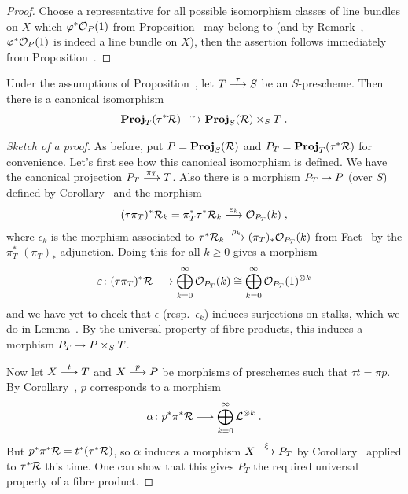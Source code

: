 \documentclass[a4paper,parskip=half,numbers=enddot, DIV=12]{scrreprt}
\renewcommand{\geq}{\geqslant}
\begin{document}
\begin{proof}
	Choose a representative for all possible isomorphism classes of line bundles on $X$ which $\varphi^*\mathcal{O}_P(1)$ from Proposition~ may belong to (and by Remark~, $\varphi^*\mathcal{O}_P(1)$ is indeed a line bundle on $X$), then the assertion follows immediately from Proposition~.
\end{proof}
\begin{cor}
	Under the assumptions of Proposition~, let $T\morphism[\tau]S$ be an $S$-prescheme. Then there is a canonical isomorphism 
	\begin{align*}
		\PROJ_T(\tau^*\Rr)\isomorphism \PROJ_S(\Rr)\times_ST\;.
	\end{align*} 
\end{cor}
\begin{proof}[Sketch of a proof]
	As before, put $P=\operatorname{\mathbf{Proj}}_S(\mathcal{R})$ and $P_T=\operatorname{\mathbf{Proj}}_T(\tau^*\mathcal{R})$ for convenience. Let's first see how this canonical isomorphism is defined. We have the canonical projection $P_T\morphism[\pi_T]T$. Also there is a morphism $P_T\morphism P$ (over $S$) defined by Corollary~ and the morphism
	\begin{align*}
		(\tau\pi_T)^*\Rr_k= \pi_T^*\tau^*\Rr_k\morphism[\epsilon_k]\Oo_{P_T}(k)\;,
	\end{align*}
	where $\epsilon_k$ is the morphism associated to $\tau^*\Rr_k\morphism[\rho_k](\pi_T)_*\Oo_{P_T}(k)$ from Fact~ by the $\pi_T^*$-$(\pi_T)_*$ adjunction. Doing this for all $k\geq 0$ gives a morphism
	\begin{align*}
		\epsilon\colon (\tau\pi_T)^*\Rr\morphism\bigoplus_{k=0}^\infty\Oo_{P_T}(k)\cong\bigoplus_{k=0}^\infty\Oo_{P_T}(1)^{\otimes k}
	\end{align*}
	and we have yet to check that $\epsilon$ (resp.\ $\epsilon_k$) induces surjections on stalks, which we do in Lemma~. By the universal property of fibre products, this induces a morphism $P_T\morphism P\times_ST$.
	
	Now let $X\morphism[t]T$ and $X\morphism[p]P$ be morphisms of preschemes such that $\tau t=\pi p$. By Corollary~, $p$ corresponds to a morphism
	\begin{align*}
		\alpha\colon p^*\pi^*\Rr\morphism\bigoplus_{k=0}^\infty\Ll^{\otimes k}\;.
	\end{align*}
	But $p^*\pi^*\mathcal{R}=t^*(\tau^*\mathcal{R})$, so $\alpha$ induces a morphism $X\morphism[\xi]P_T$ by Corollary~ applied to $\tau^*\mathcal{R}$ this time. One can show that this gives $P_T$ the required universal property of a fibre product.
\end{proof}
\end{document}
